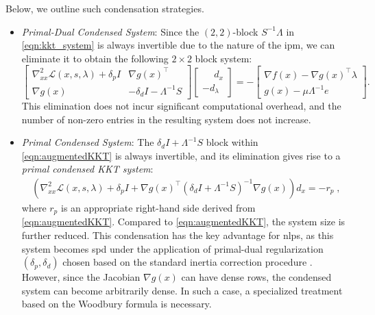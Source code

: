 \documentclass{article}
\begin{document}
Below, we outline such condensation strategies.
\begin{itemize}[leftmargin=*,itemsep=0pt,parsep=0pt,partopsep=0pt]
\item \textit{Primal-Dual Condensed System}:  
Since the \((2,2)\)-block \(S^{-1}\Lambda\) in \cref{eqn:kkt_system} is always invertible due to the nature of the \gls*{ipm}, we can eliminate it to obtain the following \(2 \times 2\) block system:  
\begin{equation}\label{eqn:augmentedKKT}
  \begin{bmatrix}
    \nabla^2_{xx} \mathcal{L}(x,s,\lambda) + \delta_p I & \nabla g(x)^\top \\
    \nabla g(x) &  - \delta_d I - \Lambda^{-1} S
  \end{bmatrix}
  \begin{bmatrix}
    \phantom{-}d_x\\
    - d_\lambda
  \end{bmatrix} =
  -\begin{bmatrix}
    \nabla f(x) - \nabla g(x)^\top \lambda\\
    g(x) - \mu \Lambda^{-1} e
  \end{bmatrix}.
\end{equation}  
This elimination does not incur significant computational overhead, and the number of non-zero entries in the resulting system does not increase.

\item \textit{Primal Condensed System}:
The $\delta_d I + \Lambda^{-1}S$ block within \eqref{eqn:augmentedKKT} is always invertible, and its elimination gives rise to a \emph{primal condensed KKT system}:
\begin{align}\label{eqn:kkt_primal}
  \left(\nabla^2_{x x} \mathcal{L}(x,s,\lambda) + \delta_p I + \nabla g(x)^\top (\delta_d I + \Lambda^{-1} S)^{-1} \nabla g(x) \right) d_x = - r_p \; ,
\end{align}
where $r_p$ is an appropriate right-hand side derived from \eqref{eqn:augmentedKKT}.
Compared to \cref{eqn:augmentedKKT}, the system size is further reduced.
This condensation has the key advantage for \glspl*{nlp}, as this system becomes \gls*{spd} under the application of primal-dual regularization $(\delta_p, \delta_d)$ chosen based on the standard inertia correction procedure \cite{shinAcceleratingOptimalPower2024}.
However, since the Jacobian $\nabla g(x)$ can have dense rows, the condensed system can become arbitrarily dense. In such a case, a specialized treatment based on the Woodbury formula is necessary.



\end{itemize}
\end{document}
